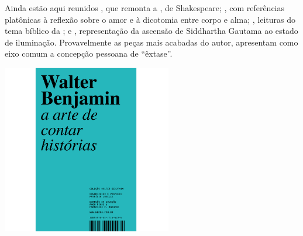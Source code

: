 Ainda estão aqui reunidos {}, que remonta a {}, de Shakespeare; {}, com referências platônicas à reflexão sobre o amor e à dicotomia entre corpo e alma; {}, leituras do
tema bíblico da {}; e {}, representação da ascensão de Siddhartha Gautama ao estado de iluminação. Provavelmente as peças mais acabadas do autor, apresentam como eixo comum a concepção pessoana de ``êxtase''. 
%

\vfill

\hspace*{-.4cm}\begin{minipage}[c]{.5\linewidth}
\small{
{}}
\end{minipage}

\pagebreak


\begin{center}
\hspace*{-3.6cm}
\hspace*{3.1cm}\includegraphics[width=74mm]{./grid/benjamin.jpg}
\end{center}

\hspace*{-7cm}\hrulefill\hspace*{-7cm}

